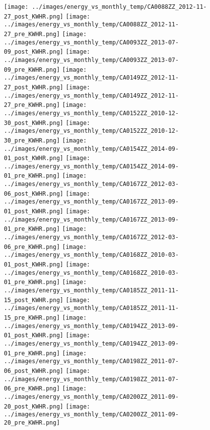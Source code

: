 \clearpage
\begin{figure}
\centering
\texttt{[image: ../images/energy\_vs\_monthly\_temp/CA0088ZZ\_2012-11-27\_post\_KWHR.png]}
\texttt{[image: ../images/energy\_vs\_monthly\_temp/CA0088ZZ\_2012-11-27\_pre\_KWHR.png]}
\texttt{[image: ../images/energy\_vs\_monthly\_temp/CA0093ZZ\_2013-07-09\_post\_KWHR.png]}
\texttt{[image: ../images/energy\_vs\_monthly\_temp/CA0093ZZ\_2013-07-09\_pre\_KWHR.png]}
\texttt{[image: ../images/energy\_vs\_monthly\_temp/CA0149ZZ\_2012-11-27\_post\_KWHR.png]}
\texttt{[image: ../images/energy\_vs\_monthly\_temp/CA0149ZZ\_2012-11-27\_pre\_KWHR.png]}
\texttt{[image: ../images/energy\_vs\_monthly\_temp/CA0152ZZ\_2010-12-30\_post\_KWHR.png]}
\texttt{[image: ../images/energy\_vs\_monthly\_temp/CA0152ZZ\_2010-12-30\_pre\_KWHR.png]}
\texttt{[image: ../images/energy\_vs\_monthly\_temp/CA0154ZZ\_2014-09-01\_post\_KWHR.png]}
\texttt{[image: ../images/energy\_vs\_monthly\_temp/CA0154ZZ\_2014-09-01\_pre\_KWHR.png]}
\texttt{[image: ../images/energy\_vs\_monthly\_temp/CA0167ZZ\_2012-03-06\_post\_KWHR.png]}
\texttt{[image: ../images/energy\_vs\_monthly\_temp/CA0167ZZ\_2013-09-01\_post\_KWHR.png]}
\texttt{[image: ../images/energy\_vs\_monthly\_temp/CA0167ZZ\_2013-09-01\_pre\_KWHR.png]}
\texttt{[image: ../images/energy\_vs\_monthly\_temp/CA0167ZZ\_2012-03-06\_pre\_KWHR.png]}
\texttt{[image: ../images/energy\_vs\_monthly\_temp/CA0168ZZ\_2010-03-01\_post\_KWHR.png]}
\texttt{[image: ../images/energy\_vs\_monthly\_temp/CA0168ZZ\_2010-03-01\_pre\_KWHR.png]}
\texttt{[image: ../images/energy\_vs\_monthly\_temp/CA0185ZZ\_2011-11-15\_post\_KWHR.png]}
\texttt{[image: ../images/energy\_vs\_monthly\_temp/CA0185ZZ\_2011-11-15\_pre\_KWHR.png]}
\texttt{[image: ../images/energy\_vs\_monthly\_temp/CA0194ZZ\_2013-09-01\_post\_KWHR.png]}
\texttt{[image: ../images/energy\_vs\_monthly\_temp/CA0194ZZ\_2013-09-01\_pre\_KWHR.png]}
\texttt{[image: ../images/energy\_vs\_monthly\_temp/CA0198ZZ\_2011-07-06\_post\_KWHR.png]}
\texttt{[image: ../images/energy\_vs\_monthly\_temp/CA0198ZZ\_2011-07-06\_pre\_KWHR.png]}
\texttt{[image: ../images/energy\_vs\_monthly\_temp/CA0200ZZ\_2011-09-20\_post\_KWHR.png]}
\texttt{[image: ../images/energy\_vs\_monthly\_temp/CA0200ZZ\_2011-09-20\_pre\_KWHR.png]}
\end{figure}
